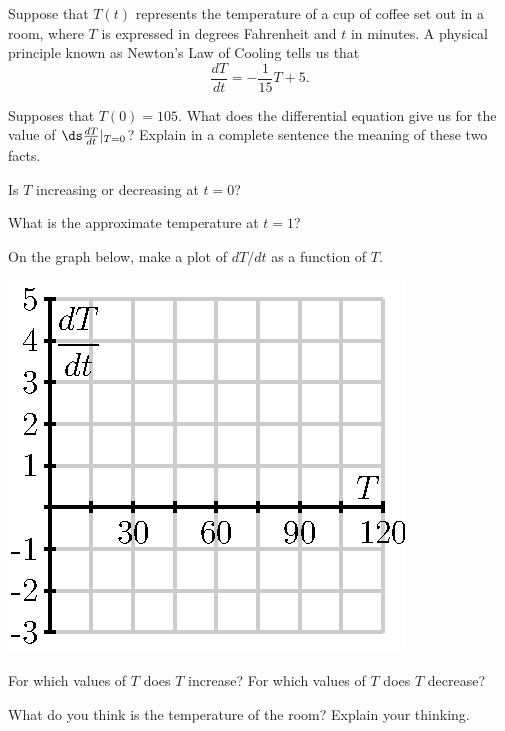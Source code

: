 \begin{exercises} 
  \item Suppose that $T(t)$ represents the temperature of a cup of
    coffee set out in a room, where $T$ is expressed in degrees
    Fahrenheit and $t$ in minutes.  A physical principle known as    Newton's Law of Cooling tells us that 
    $$
    \frac{dT}{dt}= -\frac1{15}T+5.
    $$

\ba
    \item Supposes that $T(0)=105$.  What does the differential
    equation give us for the value of $\ds \frac{dT}{dt}\vert_{T=0}$?  Explain in a
    complete sentence the meaning of these two facts.

    \item Is $T$ increasing or decreasing at $t=0$?

    \item What is the approximate temperature at $t=1$?

    \item On the graph below, make a plot of $dT/dt$ as a function of $T$.
        \begin{center}
          \includegraphics{figures/7_1_exercise_1.eps}
        \end{center}

       \item For which values of $T$ does $T$ increase?  For
        which values of $T$ does $T$ decrease?

        \item What do you think is the temperature of the room?
        Explain your thinking.


\end{exercises}
